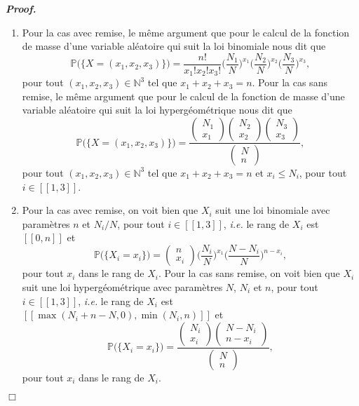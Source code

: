 \documentclass[11pt,a4paper]{article}
\newcommand{\NN}{\mathbb{N}}
\newenvironment{preuve}[1][]
{\vskip 2mm  \noindent\emph{\bf Proof#1. }}{$\Box$ \vskip 2mm}
\let\leq\leqslant
\begin{document}
		\begin{preuve}
			\begin{enumerate}
				\item Pour la cas avec remise, le même argument que pour le calcul de la fonction de masse d'une variable aléatoire qui suit la loi binomiale nous dit que 
				\[     \mathbb{P}\big(\{X = (x_{1},x_{2},x_{3}) \}\big) = \frac{n!}{x_{1}! x_{2}! x_{3}!} \bigg(\frac{N_{1}}{N}\bigg)^{x_{1}} \bigg(\frac{N_{2}}{N}\bigg)^{x_{2}} \bigg(\frac{N_{3}}{N}\bigg)^{x_{3}},      \]
				pour tout $(x_{1},x_{2},x_{3}) \in \NN^{3}$ tel que $x_{1}+x_{2}+x_{3}=n$.
				Pour la cas sans remise, le même argument que pour le calcul de la fonction de masse d'une variable aléatoire qui suit la loi hypergéométrique nous dit que 
				\[     \mathbb{P}\big(\{X = (x_{1},x_{2},x_{3}) \}\big) = \frac{\begin{pmatrix} N_{1} \\ x_{1} \end{pmatrix} \begin{pmatrix} N_{2} \\ x_{2} \end{pmatrix} \begin{pmatrix} N_{3} \\ x_{3} \end{pmatrix}}{\begin{pmatrix} N \\ n \end{pmatrix}},      \]
				pour tout $(x_{1},x_{2},x_{3}) \in \NN^{3}$ tel que $x_{1}+x_{2}+x_{3}=n$ et $x_{i} \leq N_{i}$, pour tout $i \in [\![ 1, 3 ]\!]$.
				
				\item Pour la cas avec remise, on voit bien que $X_{i}$ suit une loi binomiale avec paramètres $n$ et $N_{i}/N$, pour tout $i \in [\![ 1, 3 ]\!]$, \textit{i.e.} le rang de $X_{i}$ est $[\![ 0  , n ]\!]$ et 
				\[     \mathbb{P}\big(\{X_{i} = x_{i} \}\big) = \begin{pmatrix} n \\ x_{i} \end{pmatrix} \bigg(\frac{N_{i}}{N}\bigg)^{x_{1}} \bigg(\frac{N-N_{i}}{N}\bigg)^{n-x_{i}},      \]
				pour tout $x_{i}$ dans le rang de $X_{i}$.
				Pour la cas sans remise, on voit bien que $X_{i}$ suit une loi hypergéométrique avec paramètres $N$, $N_{i}$ et $n$, pour tout $i \in [\![ 1, 3 ]\!]$, \textit{i.e.} le rang de $X_{i}$ est $[\![ \max(N_{i}+n-N,0)  , \min(N_{i},n) ]\!]$ et 
				\[     \mathbb{P}\big(\{X_{i} = x_{i} \}\big) = \frac{\begin{pmatrix} N_{i} \\ x_{i} \end{pmatrix} \begin{pmatrix} N - N_{i} \\ n - x_{i} \end{pmatrix} }{\begin{pmatrix} N \\ n \end{pmatrix}},      \]
				pour tout $x_{i}$ dans le rang de $X_{i}$.
				

\end{enumerate}
\end{preuve}
\end{document}

